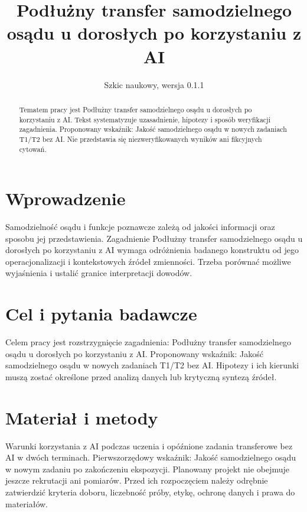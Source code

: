 \documentclass[11pt,a4paper]{article}
\title{Podłużny transfer samodzielnego osądu u dorosłych po korzystaniu z AI}
\author{}
\date{Szkic naukowy, wersja 0.1.1}
\begin{document}
\maketitle

\begin{abstract}

Tematem pracy jest Podłużny transfer samodzielnego osądu u dorosłych po korzystaniu z AI. Tekst systematyzuje uzasadnienie, hipotezy i sposób weryfikacji zagadnienia. Proponowany wskaźnik: Jakość samodzielnego osądu w nowych zadaniach T1/T2 bez AI. Nie przedstawia się niezweryfikowanych wyników ani fikcyjnych cytowań.

\end{abstract}

\section{Wprowadzenie}

Samodzielność osądu i funkcje poznawcze zależą od jakości informacji oraz sposobu jej przedstawienia. Zagadnienie Podłużny transfer samodzielnego osądu u dorosłych po korzystaniu z AI wymaga odróżnienia badanego konstruktu od jego operacjonalizacji i kontekstowych źródeł zmienności. Trzeba porównać możliwe wyjaśnienia i ustalić granice interpretacji dowodów.

\section{Cel i pytania badawcze}

Celem pracy jest rozstrzygnięcie zagadnienia: Podłużny transfer samodzielnego osądu u dorosłych po korzystaniu z AI. Proponowany wskaźnik: Jakość samodzielnego osądu w nowych zadaniach T1/T2 bez AI. Hipotezy i ich kierunki muszą zostać określone przed analizą danych lub krytyczną syntezą źródeł.

\section{Materiał i metody}

Warunki korzystania z AI podczas uczenia i opóźnione zadania transferowe bez AI w dwóch terminach. Pierwszorzędowy wskaźnik: Jakość samodzielnego osądu w nowym zadaniu po zakończeniu ekspozycji. Planowany projekt nie obejmuje jeszcze rekrutacji ani pomiarów. Przed ich rozpoczęciem należy odrębnie zatwierdzić kryteria doboru, liczebność próby, etykę, ochronę danych i prawa do materiałów.
\end{document}

